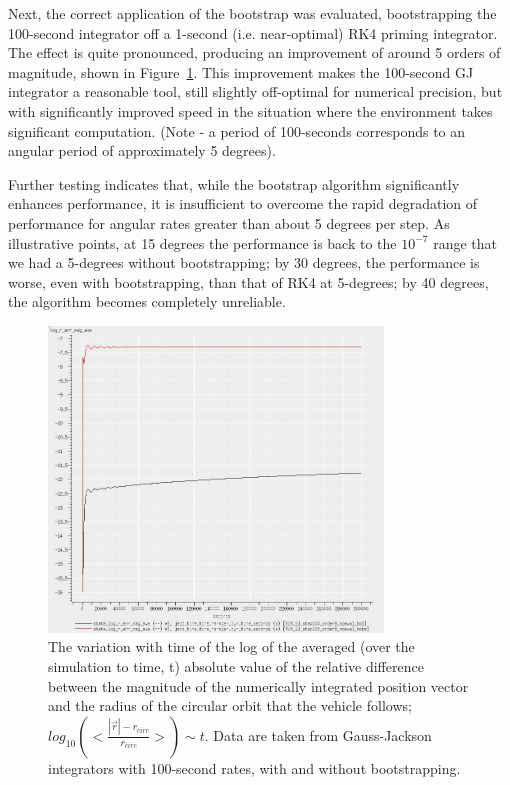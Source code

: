 \begin{description}
Next, the correct application of the bootstrap was evaluated, bootstrapping 
the 100-second integrator off a 1-second (i.e. near-optimal) RK4 priming 
integrator.  The effect is quite 
pronounced, producing an improvement of around 5 orders of magnitude, shown in
Figure~\ref{fig:GJ_bootstrap_long_log}.  This improvement makes the 
100-second GJ integrator a reasonable tool, still slightly off-optimal for 
numerical precision, but with significantly improved speed in the situation 
where the environment takes significant computation.
(Note - a period of 100-seconds corresponds to an angular period of 
approximately 5 degrees).

Further testing indicates that, while the bootstrap algorithm significantly 
enhances performance, it is insufficient to overcome the rapid degradation of 
performance for angular rates greater than about 5 degrees per step.  As 
illustrative points, at 15 degrees the performance is back to the $10^{-7}$ 
range that we had a 5-degrees without bootstrapping; by 30 degrees, the 
performance is worse, even with bootstrapping, than that of RK4 at 5-degrees; 
by 40 degrees, the algorithm becomes completely unreliable.

\begin{figure}[!ht]
\centering
\includegraphics[width=3.5in]{figures/GJ_bootstrap_long_log.jpg}
\caption[Variation with Time of Orbital Position Error]
{The variation with time of the log of the averaged (over the 
simulation to time, t) absolute value of the relative difference between the 
magnitude of the numerically integrated position vector and the radius of the 
circular orbit that the vehicle follows; $log_{10} (<\frac{|\vec{r}| - 
r_{circ}}{r_{circ}}>) \sim t$.  Data are taken from Gauss-Jackson 
integrators with 100-second rates, with and without bootstrapping.}
\label{fig:GJ_bootstrap_long_log}
\end{figure}
\clearpage


\end{description}
